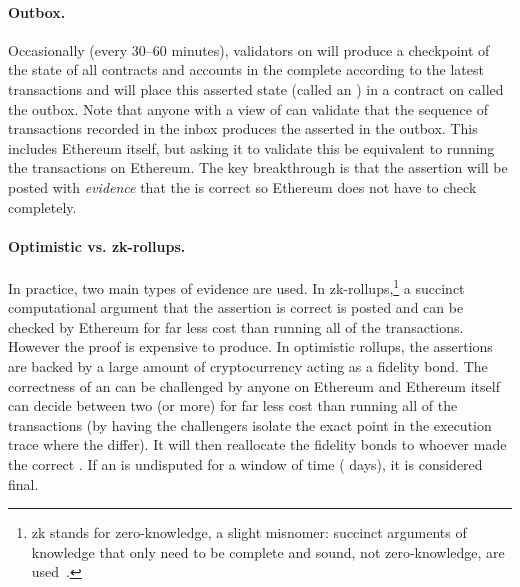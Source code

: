 \paragraph*{Outbox.} Occasionally (\eg every 30--60 minutes), validators on \layertwo will produce a checkpoint of the state of all contracts and accounts in the complete \layertwo according to the latest transactions and will place this asserted state (called an \rblock) in a contract on \layerone called the outbox. Note that anyone with a view of \layerone can validate that the sequence of transactions recorded in the inbox produces the asserted \rblock in the outbox. This includes Ethereum itself, but asking it to validate this be equivalent to running the transactions on Ethereum. The key breakthrough is that the assertion will be posted with \textit{evidence} that the \rblock is correct so Ethereum does not have to check completely.

\paragraph*{Optimistic vs. zk-rollups.} In practice, two main types of evidence are used. In zk-rollups,\footnote{zk stands for zero-knowledge, a slight misnomer: succinct arguments of knowledge that only need to be complete and sound, not zero-knowledge, are used~\cite{Mei21}.} a succinct computational argument that the assertion is correct is posted and can be checked by Ethereum for far less cost than running all of the transactions. However the proof is expensive to produce. In optimistic rollups, the assertions are backed by a large amount of cryptocurrency acting as a fidelity bond. The correctness of an \rblock can be challenged by anyone on Ethereum and Ethereum itself can decide between two (or more) \rblocks for far less cost than running all of the transactions (by having the challengers isolate the exact point in the execution trace where the \rblocks differ). It will then reallocate the fidelity bonds to whoever made the correct \rblock. If an \rblock is undisputed for a window of time ( days), it is considered final.

